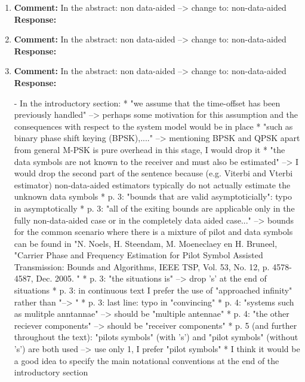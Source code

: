 \documentclass{article}
\begin{document}
\begin{enumerate}

\item \textbf{Comment:} In the abstract: non data-aided --> change to: non-data-aided \\
\textbf{Response:}

\item \textbf{Comment:} In the abstract: non data-aided --> change to: non-data-aided \\
\textbf{Response:}

\item \textbf{Comment:} In the abstract: non data-aided --> change to: non-data-aided \\
\textbf{Response:}

- In the introductory section:
     * "we assume that the time-offset has been previously handled" --> perhaps some motivation for this assumption and the consequences with respect to the system model would be in place
     * "such as binary phase shift keying (BPSK),...." --> mentioning BPSK and QPSK apart from general M-PSK is pure overhead in this stage, I would drop it
     * "the data symbols are not known to the receiver and must also be estimated" --> I would drop the second part of the sentence because (e.g. Viterbi and Vterbi estimator) non-data-aided estimators typically do not actually estimate the unknown data symbols
     * p. 3: "bounds that are valid asymptoticially": typo in asymptotically
     * p. 3: "all of the exiting bounds are applicable only in the fully non-data-aided case or in the completely data aided case..." --> bounds for the common scenario where there is a mixture of pilot and data symbols can be found in "N. Noels, H. Steendam, M. Moeneclaey en H. Bruneel, "Carrier Phase and Frequency Estimation for Pilot Symbol Assisted Transmission: Bounds and Algorithms, IEEE TSP, Vol. 53, No. 12, p. 4578-4587, Dec. 2005. "
     * p. 3: "the situations is" --> drop 's' at the end of situations
     * p. 3: in continuous text I prefer the use of "approached infinity" rather than "--> \infty"
     * p. 3: last line: typo in "convincing"
     * p. 4: "systems such as mulitple anntannae" --> should be "multiple antennae"
     * p. 4: "the other reciever components" --> should be "receiver components"
     * p. 5 (and further throughout the text): "pilots symbols" (with 's') and "pilot symbols" (without 's') are both used --> use only 1, I prefer "pilot symbols"
     * I think it would be a good idea to specify the main notational conventions at the end of the introductory section

\end{enumerate}
\end{document}
